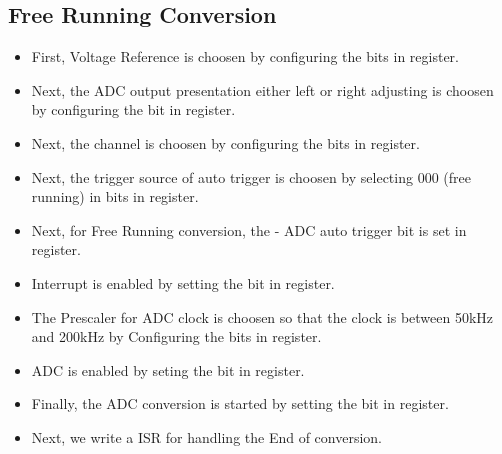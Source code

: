 \documentclass{article}
\begin{document}
\subsection{Free Running Conversion}
\begin{itemize}
    \item First, Voltage Reference is choosen by configuring the  bits in  register.
    \item Next, the ADC output presentation either left or right adjusting is choosen by configuring the  bit in  register.
    \item Next, the channel is choosen by configuring the  bits in  register.
    \item Next, the trigger source of auto trigger is choosen by selecting 000 (free running) in  bits in  register.
    \item Next, for Free Running conversion, the  - ADC auto trigger bit is set in  register.
    \item Interrupt is enabled by setting the  bit in  register.
    \item The Prescaler for ADC clock is choosen so that the clock is  between 50kHz and 200kHz  by Configuring the  bits in  register.
    \item ADC is enabled by seting the  bit in  register.
    \item Finally, the ADC conversion is started by setting the  bit in   register.
    \item Next, we write a ISR for handling the End of conversion.
\end{itemize}
\end{document}
